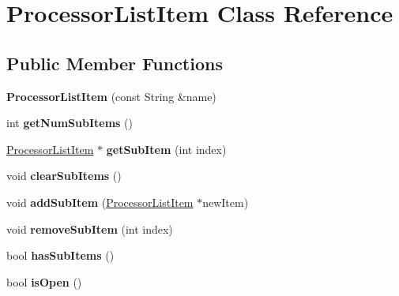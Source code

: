 \hypertarget{classProcessorListItem}{\section{Processor\-List\-Item Class Reference}
\label{classProcessorListItem}
}
\subsection*{Public Member Functions}
\begin{DoxyCompactItemize}
\item 
\hypertarget{classProcessorListItem_a6089a302cb290dead024ad158ae8e28f}{{\bfseries Processor\-List\-Item} (const String \&name)}\label{classProcessorListItem_a6089a302cb290dead024ad158ae8e28f}

\item 
\hypertarget{classProcessorListItem_ad783cc2b23fcebf02e905675c681a585}{int {\bfseries get\-Num\-Sub\-Items} ()}\label{classProcessorListItem_ad783cc2b23fcebf02e905675c681a585}

\item 
\hypertarget{classProcessorListItem_a090fba411589dbfe64c11284f15338e6}{\hyperlink{classProcessorListItem}{Processor\-List\-Item} $\ast$ {\bfseries get\-Sub\-Item} (int index)}\label{classProcessorListItem_a090fba411589dbfe64c11284f15338e6}

\item 
\hypertarget{classProcessorListItem_a5eb6d9eee08bb55eb66fec2439cbac4a}{void {\bfseries clear\-Sub\-Items} ()}\label{classProcessorListItem_a5eb6d9eee08bb55eb66fec2439cbac4a}

\item 
\hypertarget{classProcessorListItem_a8aa12edb07c98dbb694db1676b6e1031}{void {\bfseries add\-Sub\-Item} (\hyperlink{classProcessorListItem}{Processor\-List\-Item} $\ast$new\-Item)}\label{classProcessorListItem_a8aa12edb07c98dbb694db1676b6e1031}

\item 
\hypertarget{classProcessorListItem_a7f69ff3e9d1768c659f779d089306845}{void {\bfseries remove\-Sub\-Item} (int index)}\label{classProcessorListItem_a7f69ff3e9d1768c659f779d089306845}

\item 
\hypertarget{classProcessorListItem_a4067f5a19339bbafab90a3174e6b03a9}{bool {\bfseries has\-Sub\-Items} ()}\label{classProcessorListItem_a4067f5a19339bbafab90a3174e6b03a9}

\item 
\hypertarget{classProcessorListItem_a1818202eeefd19ef582260fc44da8fe5}{bool {\bfseries is\-Open} ()}\label{classProcessorListItem_a1818202eeefd19ef582260fc44da8fe5}


\end{DoxyCompactItemize}
